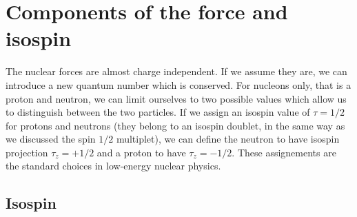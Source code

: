 \documentclass[graybox,sectrefs,envcountresetchap,open=right]{svmonodo}
\begin{document}
\section{Components of the force and isospin}

 The nuclear forces are almost charge independent. If we assume they are, 
we can introduce a new quantum number which is conserved. For nucleons only, that is a proton and neutron, we can limit ourselves
to two possible values which allow us to distinguish between the two particles. If we assign an isospin value of $\tau=1/2$ for protons
and neutrons (they belong to an isospin doublet, in the same way as we discussed the spin $1/2$ multiplet), we can define 
the neutron to have isospin projection $\tau_z=+1/2$ and a proton to have $\tau_z=-1/2$. These assignements are the standard choices in low-energy nuclear physics.

\subsection{Isospin}
\end{document}
